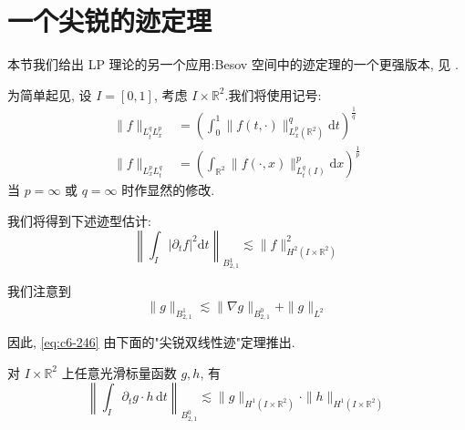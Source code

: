 \section{一个尖锐的迹定理}

本节我们给出 LP 理论的另一个应用:Besov 空间中的迹定理的一个更强版本, 见 \cite{kl-rodn3}.

为简单起见, 设 $I = [0, 1]$, 考虑 $I \times \mathbb{R}^2$.我们将使用记号:
\begin{align*}
\|f\|_{L^q_t L^p_x} &= \left(\int_0^1 \|f(t, \cdot)\|^q_{L^p_x(\mathbb{R}^2)} \mathrm{d}t\right)^{\frac{1}{q}} \\
\|f\|_{L^p_x L^q_t} &= \left(\int_{\mathbb{R}^2} \|f(\cdot, x)\|^p_{L^q_t(I)} \mathrm{d}x\right)^{\frac{1}{p}}
\end{align*}
当 $p = \infty$ 或 $q = \infty$ 时作显然的修改.

我们将得到下述迹型估计:
\begin{equation}
\left\| \int_I |\partial_t f|^2 \mathrm{d}t \right\|_{B_{2, 1}^{1}} \lesssim \|f\|^2_{H^2(I \times \mathbb{R}^2)}\label{eq:c6-246}
\end{equation}

我们注意到
\[
\|g\|_{B_{2, 1}^{1}} \lesssim \|\nabla g\|_{B_{2, 1}^{0}} + \|g\|_{L^2}
\]

因此, \eqref{eq:c6-246} 由下面的"尖锐双线性迹"定理推出.

\begin{theorem}\label{thm:c6-5.1}
对 $I \times \mathbb{R}^2$ 上任意光滑标量函数 $g, h$, 有
\begin{equation}
\left\| \int_I \partial_t g \cdot h\, \mathrm{d}t \right\|_{B_{2, 1}^{0}} \lesssim \|g\|_{H^1(I \times \mathbb{R}^2)} \cdot \|h\|_{H^1(I \times \mathbb{R}^2)}\label{eq:c6-247}
\end{equation}
\end{theorem}

